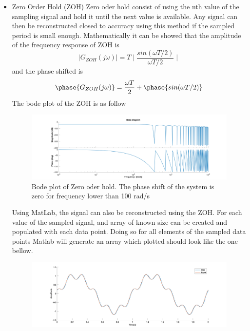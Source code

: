 \documentclass[12pt,letterpaper]{article}
\begin{document}
\begin{itemize}
\begin{figure}[h]
{            using Matlab and the sinc function. The reconstructed signal is liaised}    
        \end{figure}
    the reconstructed signal does look nothing like the input signal. This phenomena is know as 
    liaising. 
    As mentioned above, a perfect low pass filter can not be design 
    in real life, thus engineers have come with many brilliant ideas
    to design ADC and DAC. 
    \item Zero Order Hold (ZOH)
    Zero oder hold consist of using the nth value of the sampling signal
    and hold it until the next value is available. Any signal can then be reconstructed
    closed to accuracy using this method if the sampled period is small
    enough. Mathematically it can be showed that the amplitude of the frequency 
    response of ZOH is 
    \begin{equation}
        \mid G_{ZOH}(j\omega)\mid =T\mid \frac{sin(\omega T/2)}{\omega T/2}\mid
    \end{equation}
    and the phase shifted is 
    \begin{equation}
        \phase {G_{ZOH}(j\omega)} =\frac{\omega T}{2} + \phase{sin(\omega T/2)}
    \end{equation}
    The bode plot of the ZOH is as follow
    \begin{figure}[h]
        \centering
            \includegraphics[width=15cm]{bode_ZOH.jpg}
            \caption{Bode plot of Zero oder hold. The phase shift
            of the system is zero for frequency lower than 100 rad/s}
    \end{figure}
    Using MatLab, the signal can also be reconstructed using the ZOH. For each value
    of the sampled signal, and array of known size can be created and 
    populated with each data point. Doing so for all elements of the sampled
    data points Matlab will generate an array which plotted should 
    look like the one bellow. 
    \begin{figure}[h]
        \centering
            \includegraphics[width=15cm]{ZOH.jpg}

\end{figure}
\end{itemize}
\end{document}
